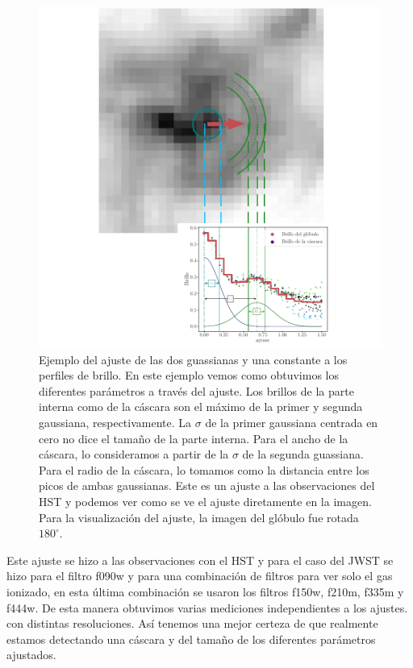 \documentclass{book}
\begin{document}
\begin{figure}[htbp]
    \centering
    \includegraphics[width=\textwidth]{Nuevas imagenes finales/ejemplo_ajuste_2.pdf}
    \caption{Ejemplo del ajuste de las dos guassianas y una constante a los perfiles de brillo. En este ejemplo vemos como obtuvimos los diferentes parámetros a través del ajuste. Los brillos de la parte interna como de la cáscara son el máximo de la primer y segunda gaussiana, respectivamente. La $\sigma$ de la primer gaussiana centrada en cero no dice el tamaño de la parte interna. Para el ancho de la cáscara, lo consideramos a partir de la $\sigma$ de la segunda guassiana. Para el radio de la cáscara, lo tomamos como la distancia entre los picos de ambas gaussianas. Este es un ajuste a las observaciones del HST y podemos ver como se ve el ajuste diretamente en la imagen. Para la visualización del ajuste, la imagen del glóbulo fue rotada $180^\circ$.}
    \label{ejemplo ajuste}
\end{figure}

Este ajuste se hizo a las observaciones con el HST y para el caso del JWST se hizo para el filtro f090w  y para una combinación de filtros para ver solo el gas ionizado, en esta última combinación se usaron los filtros f150w, f210m, f335m  y f444w. De esta manera obtuvimos varias mediciones independientes a los ajustes. con distintas resoluciones. Así tenemos una mejor certeza de que realmente estamos detectando una cáscara y del tamaño de los diferentes parámetros ajustados.
\newpage
\end{document}
